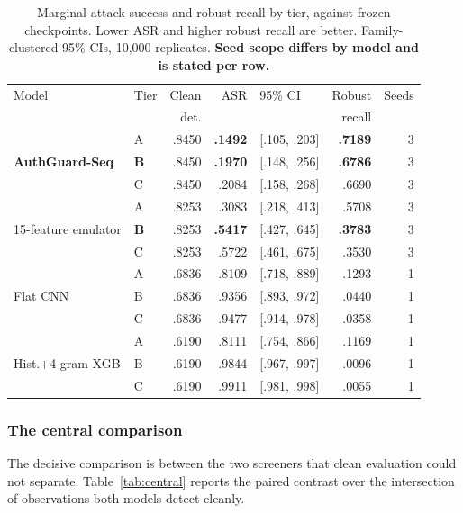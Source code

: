 \documentclass[conference]{IEEEtran}
\begin{document}
\begin{table}[t]
\centering
\caption{Marginal attack success and robust recall by tier, against frozen checkpoints. Lower ASR and higher robust recall are better. Family-clustered 95\% CIs, 10,000 replicates. \textbf{Seed scope differs by model and is stated per row.}}
\label{tab:tiers}
\scriptsize
\setlength{\tabcolsep}{3pt}
\begin{tabular}{@{}llrrlrr@{}}
\toprule
Model & Tier & Clean & ASR & 95\% CI & Robust & Seeds \\
 & & det. & & & recall & \\
\midrule
\multirow{3}{*}{\textbf{AuthGuard-Seq}}
 & A & .8450 & \textbf{.1492} & [.105, .203] & \textbf{.7189} & 3 \\
 & \textbf{B} & .8450 & \textbf{.1970} & [.148, .256] & \textbf{.6786} & 3 \\
 & C & .8450 & .2084 & [.158, .268] & .6690 & 3 \\
\midrule
\multirow{3}{*}{15-feature emulator}
 & A & .8253 & .3083 & [.218, .413] & .5708 & 3 \\
 & \textbf{B} & .8253 & \textbf{.5417} & [.427, .645] & \textbf{.3783} & 3 \\
 & C & .8253 & .5722 & [.461, .675] & .3530 & 3 \\
\midrule
\multirow{3}{*}{Flat CNN}
 & A & .6836 & .8109 & [.718, .889] & .1293 & 1 \\
 & B & .6836 & .9356 & [.893, .972] & .0440 & 1 \\
 & C & .6836 & .9477 & [.914, .978] & .0358 & 1 \\
\midrule
\multirow{3}{*}{Hist.+4-gram XGB}
 & A & .6190 & .8111 & [.754, .866] & .1169 & 1 \\
 & B & .6190 & .9844 & [.967, .997] & .0096 & 1 \\
 & C & .6190 & .9911 & [.981, .998] & .0055 & 1 \\
\bottomrule
\end{tabular}
\end{table}

\subsubsection{The central comparison}

The decisive comparison is between the two screeners that clean evaluation could not separate. Table~\ref{tab:central} reports the paired contrast over the intersection of observations both models detect cleanly.
\end{document}
